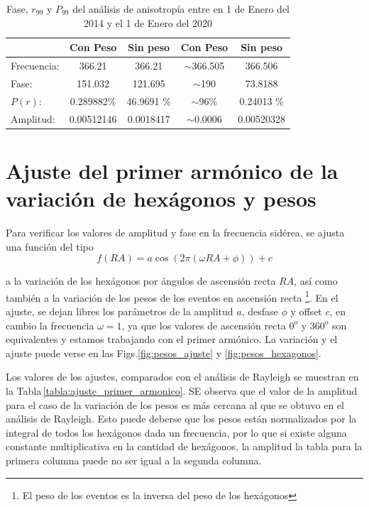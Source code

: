 


\begin{table}[H]
\centering
\begin{tabular}{l|c|c|c|c}
				& Con Peso 		& Sin peso 		& Con Peso 		& Sin peso 		\\ \hline
Frecuencia:		& 366.21 		& 366.21 		& $\sim$366.505 & 366.506 		\\
Fase:			& 151.032 		& 121.695		& $\sim$190 	& 73.8188		\\
$P(r)$:		& 0.289882\%	& 46.9691 \% 	& $\sim$96\%	& 0.24013 \% 	\\
Amplitud:		& 0.00512146	& 0.0018417		& $\sim$0.0006	& 0.00520328	\\
\end{tabular}
\caption{Fase, $r_{99}$ y $P_{99}$ del análisis de anisotropía entre en 1 de Enero del 2014 y el 1 de Enero del 2020}
\label{tabla:pico}
\end{table}


\section{Ajuste del primer armónico de la variación de hexágonos y pesos}

Para verificar los valores de amplitud y fase en la frecuencia sidérea, se ajusta una función del tipo 
\begin{equation}
	f(RA) = a\cos{(2\pi(\omega RA + \phi))} +c
\end{equation}

a la variación de los hexágonos por ángulos de ascensión recta $RA$, así como también a la variación de los pesos de los eventos en ascensión recta \footnote{El peso de los eventos es la inversa del peso de los hexágonos}. En el ajuste, se dejan libres los parámetros de la amplitud $a$, desfase $\phi$ y offset $c$, en cambio la frecuencia $\omega=1$, ya que los valores de ascensión recta $0^o$ y $360^o$ son equivalentes y estamos trabajando con el primer armónico. La variación y el ajuste puede verse en las Figs.\ref{fig:pesos_ajuste} y \ref{fig:pesos_hexagonos}.

Los valores de los ajustes, comparados con el análisis de Rayleigh se muestran en la Tabla\,\ref{tabla:ajuste_primer_armonico}. SE observa que el valor de la amplitud para el caso de la variación de los pesos es más cercana al que se obtuvo en el análisis de Rayleigh. Esto puede deberse que los pesos están normalizados por la integral de todos los hexágonos dada un frecuencia, por lo que si existe alguna constante multiplicativa en la cantidad de hexágonos, la amplitud la tabla para la primera columna puede no ser igual a la segunda columna.

